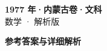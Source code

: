 \documentclass[zihao=-4, a4paper]{ctexart}
\begin{document}
\begin{center}
  {\Large\bfseries 1977 年·内蒙古卷·文科}\\[4pt]
  {\large 数学 · 解析版}
\end{center}
\medskip
{}

\clearpage
{}
\begin{center}{\Large\bfseries 参考答案与详细解析}\end{center}
\medskip

\end{document}
